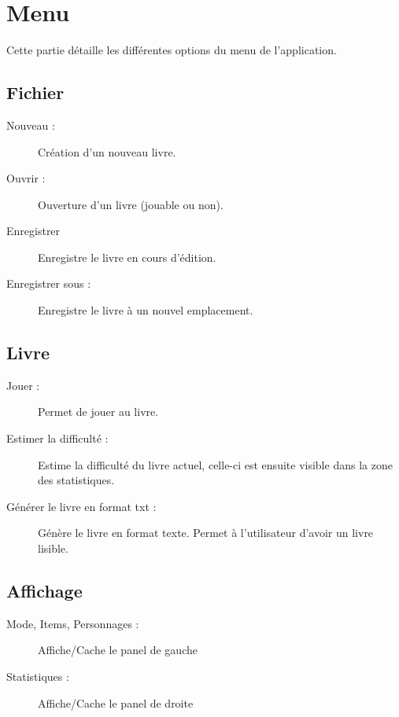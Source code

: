 \chapter{Menu}

	Cette partie détaille les différentes options du menu de l'application.

	\section{Fichier}
		\begin{description}
			\item[Nouveau :]{Création d'un nouveau livre.}
			\item[Ouvrir :]{Ouverture d'un livre (jouable ou non).}
			\item[Enregistrer]{Enregistre le livre en cours d'édition.}
			\item[Enregistrer sous :]{Enregistre le livre à un nouvel emplacement.}
		\end{description}

	\section{Livre}
		\begin{description}
			\item[Jouer :]{Permet de jouer au livre.}
			\item[Estimer la difficulté :]{Estime la difficulté du livre actuel, celle-ci est ensuite visible dans la zone des statistiques.}
			\item[Générer le livre en format txt :]{Génère le livre en format texte. Permet à l'utilisateur d'avoir un livre lisible.}
		\end{description}

	\section{Affichage}

		\begin{description}
			\item[Mode, Items, Personnages :]{Affiche/Cache le panel de gauche}
			\item[Statistiques :]{Affiche/Cache le panel de droite}
		\end{description}
